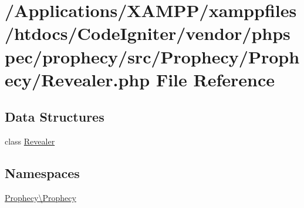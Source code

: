 \hypertarget{_revealer_8php}{}\section{/\+Applications/\+X\+A\+M\+P\+P/xamppfiles/htdocs/\+Code\+Igniter/vendor/phpspec/prophecy/src/\+Prophecy/\+Prophecy/\+Revealer.php File Reference}
\label{_revealer_8php}
\subsection*{Data Structures}
\begin{DoxyCompactItemize}
\item 
class \mbox{\hyperlink{class_prophecy_1_1_prophecy_1_1_revealer}{Revealer}}
\end{DoxyCompactItemize}
\subsection*{Namespaces}
\begin{DoxyCompactItemize}
\item 
 \mbox{\hyperlink{namespace_prophecy_1_1_prophecy}{Prophecy\textbackslash{}\+Prophecy}}
\end{DoxyCompactItemize}
